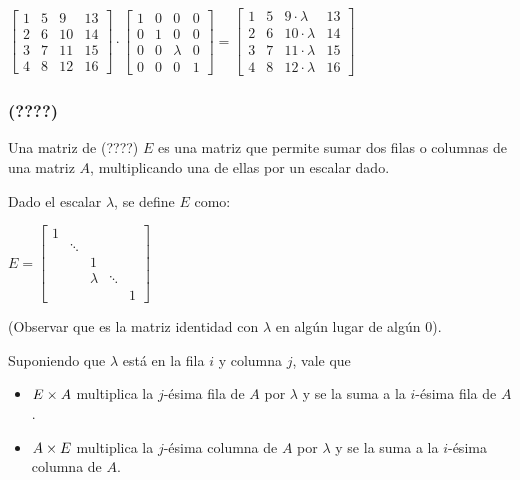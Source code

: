 \documentclass[]{article}
\begin{document}
\begin{center}
	$\begin{bmatrix}
		1&5&9&13 \\
		2&6&10&14 \\
		3&7&11&15 \\
		4&8&12&16
	\end{bmatrix} \cdot
	\begin{bmatrix}
			1&0&0&0 \\
			0&1&0&0 \\
			0&0&\lambda&0 \\
			0&0&0&1
		\end{bmatrix} =
	\begin{bmatrix}
		1&5&9\cdot\lambda&13 \\
		2&6&10\cdot\lambda&14 \\
		3&7&11\cdot\lambda&15 \\
		4&8&12\cdot\lambda&16
	\end{bmatrix}
	$
\end{center}


\subsubsection{(????)}
Una matriz de (????) $E$ es una matriz que permite sumar dos filas o columnas de una matriz $A$, multiplicando una de ellas por un escalar dado.

Dado el escalar $\lambda$, se define $E$ como:
\begin{center}
	$E = \begin{bmatrix}
		1 & & & & \\
		& \ddots & & & \\
		& & 1 & & \\
		& & \lambda & \ddots & \\
		& & & & 1
	\end{bmatrix}$
\end{center}

(Observar que es la matriz identidad con $\lambda$ en algún lugar de algún $0$).

Suponiendo que $\lambda$ está en la fila $i$ y columna $j$, vale que
\begin{itemize}
	\item $E \times A$ multiplica la $j$-ésima fila de $A$ por $\lambda$ y se la suma a la $i$-ésima fila de $A$.
	\item $A \times E$ multiplica la $j$-ésima columna de $A$ por $\lambda$ y se la suma a la $i$-ésima columna de $A$.
\end{itemize}
\end{document}
